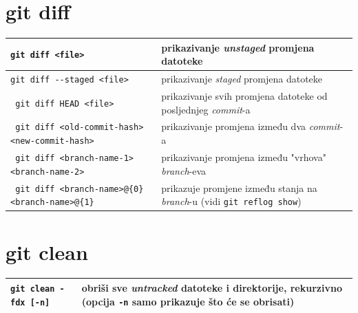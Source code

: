 \documentclass[10pt]{article}
\begin{document}
    \section*{\color{BrickRed} git diff}
    \begin{tabular}{|>{\tt}p{9.25cm}|>{}p{15.50cm}|}
        \hline
        git diff <file>                                         & prikazivanje \textit{unstaged} promjena datoteke \\ \hline
        git diff -{}-staged <file>                              & prikazivanje \textit{staged} promjena datoteke \\ \hline
        git diff HEAD <file>                                    & prikazivanje svih promjena datoteke od posljednjeg \textit{commit}-a \\ \hline
        git diff <old-commit-hash> <new-commit-hash>            & prikazivanje promjena između dva \textit{commit}-a \\ \hline
        git diff <branch-name-1> <branch-name-2>                & prikazivanje promjena između "vrhova" \textit{branch}-eva \\ \hline
        git diff <branch-name>@\{0\} <branch-name>@\{1\}        & prikazuje promjene između stanja na \textit{branch}-u (vidi \texttt{git reflog show}) \\ \hline
    \end{tabular}

    \section*{\color{BrickRed} git clean}
    \begin{tabular}{|>{\tt}p{9.25cm}|>{}p{15.50cm}|}
        \hline
        git clean -fdx [-n]                             & obriši sve \textit{untracked} datoteke i direktorije, rekurzivno (opcija \texttt{-n} samo prikazuje što će se obrisati) \\ \hline
    \end{tabular}
\end{document}
